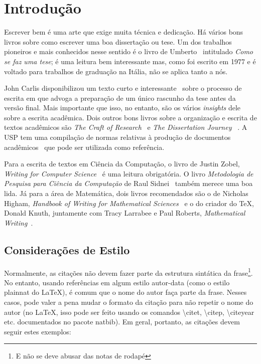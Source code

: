 \chapter{Introdução}
\label{cap:introducao}

Escrever bem é uma arte que exige muita técnica e dedicação. Há vários bons livros
sobre como escrever uma boa dissertação ou tese. Um dos trabalhos pioneiros e mais
conhecidos nesse sentido é o livro de
Umberto~\citet{eco:09} %
intitulado \emph{Como se faz uma tese}; é uma leitura bem interessante mas, como
foi escrito em 1977 e é voltado para trabalhos de graduação na Itália, não se aplica
tanto a nós.

John Carlis disponibilizou um texto curto e interessante~\citep{carlis:09} sobre
o processo de escrita em que advoga a preparação de um único rascunho da tese
antes da versão final. Mais importante que isso, no entanto, são os vários
\textit{insights} dele sobre a escrita acadêmica. Dois outros bons livros sobre
a organização e escrita de textos acadêmicos são \emph{The Craft of
Research}~\citep{craftresearch} e \emph{The Dissertation Journey}~
\citep{dissertjourney}. A USP tem uma compilação de normas relativas à produção
de documentos acadêmicos~\citep{usp:guidelines} que pode ser utilizada como
referência.

Para a escrita de textos em Ciência da Computação, o livro de Justin Zobel,
\emph{Writing for Computer Science}~\citep{zobel:04} é uma leitura obrigatória.
O livro \emph{Metodologia de Pesquisa para Ciência da Computação} de
Raul Sidnei~\citet{waz:09} %
também merece uma boa lida. Já para a área de Matemática, dois livros recomendados
são o de Nicholas Higham, \emph{Handbook of Writing for Mathematical Sciences}~
\citep{Higham:98} e o do criador do \TeX{}, Donald Knuth, juntamente com Tracy
Larrabee e Paul Roberts, \emph{Mathematical Writing}~\citep{Knuth:96}.

\section{Considerações de Estilo}
\label{sec:consideracoes_preliminares}

Normalmente, as citações não devem fazer parte da estrutura sintática da
frase\footnote{E não se deve abusar das notas de rodapé}. No entanto, usando
referências em algum estilo autor-data (como o estilo plainnat do \LaTeX{}), é
comum que o nome do autor faça parte da frase. Nesses casos, pode valer a pena
mudar o formato da citação para não repetir o nome do autor (no \LaTeX{}, isso
pode ser feito usando os comandos \textbackslash{}citet, \textbackslash{}citep,
\textbackslash{}citeyear etc. documentados no pacote natbib). Em geral, portanto,
as citações devem seguir estes exemplos:


